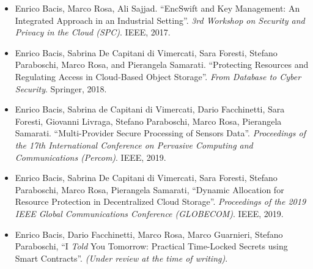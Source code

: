 \begin{itemize}
			\item Enrico Bacis, Marco Rosa, Ali Sajjad. ``EncSwift and Key Management: An Integrated Approach in an Industrial Setting''. {\em 3rd Workshop on Security and Privacy in the Cloud (SPC)}. IEEE, 2017.
			
			\item Enrico Bacis, Sabrina De Capitani di Vimercati, Sara Foresti, Stefano Paraboschi, Marco Rosa, and Pierangela Samarati. ``Protecting Resources and Regulating Access in Cloud-Based Object Storage''. {\em From Database to Cyber Security}. Springer, 2018.
			
			\item  Enrico Bacis, Sabrina de Capitani di Vimercati, Dario Facchinetti, Sara Foresti, Giovanni Livraga, Stefano Paraboschi, Marco Rosa, Pierangela Samarati. ``Multi-Provider Secure Processing of Sensors Data''. {\em Proceedings of the 17th International Conference on Pervasive Computing and Communications (Percom)}. IEEE, 2019.
			
			\item Enrico Bacis, Sabrina De Capitani di Vimercati, Sara Foresti, Stefano Paraboschi, Marco Rosa, Pierangela Samarati, ``Dynamic Allocation for Resource Protection in Decentralized Cloud Storage''. {\em Proceedings of the 2019 IEEE Global Communications Conference (GLOBECOM)}. IEEE, 2019.
	
			\item Enrico Bacis, Dario Facchinetti, Marco Rosa, Marco Guarnieri, Stefano Paraboschi, ``I {\em Told} You Tomorrow: Practical Time-Locked Secrets using Smart Contracts''. {\em (Under review at the time of writing)}.
\end{itemize}
